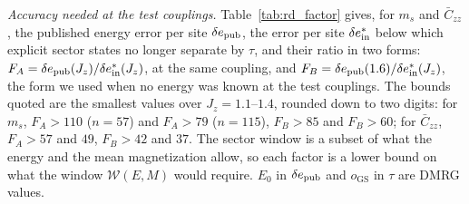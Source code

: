 \documentclass[aps,prx,onecolumn,10pt,nofootinbib,longbibliography,floatfix]{revtex4-2}
\theoremstyle{remark}
\newcommand{\Jz}{J_z}
\newcommand{\ms}{m_s}
\newcommand{\Czz}{\bar C_{zz}}
\newcommand{\de}{\delta e}
\newcommand{\des}{\delta e^{*}}
\newcommand{\W}{\mathcal{W}}
\newcommand{\GS}{\mathrm{GS}}
\begin{document}
\emph{Accuracy needed at the test couplings.} Table~\ref{tab:rd_factor} gives, for $\ms$ and $\Czz$, the published
energy error per site $\de_{\rm pub}$, the error per site $\des_{\rm in}$ below which explicit sector states no longer
separate by $\tau$, and their ratio in two forms: $F_A=\de_{\rm pub}(\Jz)/\des_{\rm in}(\Jz)$, at the same coupling, and
$F_B=\de_{\rm pub}(1.6)/\des_{\rm in}(\Jz)$, the form we used when no energy was known at the test couplings. The %
bounds quoted are the smallest values over $\Jz=1.1$--$1.4$, rounded down to two digits: for $\ms$, $F_A>110$ %
($n=57$) and $F_A>79$ ($n=115$), $F_B>85$ and $F_B>60$; for $\Czz$, $F_A>57$ and $49$, $F_B>42$ and $37$. The sector %
window is a subset of what the energy and the mean magnetization allow, so each factor is a lower bound on what
the window $\W(E,M)$ would require. $E_0$ in $\de_{\rm pub}$ and $o_\GS$ in $\tau$ are DMRG values.

\def\SMcap{Accuracy that the energy would need at the test couplings. $\de_{\rm pub}$: published energy error per %
site; $\des_{\rm in}$: error per site at which explicit sector states are $\tau$ apart; $F_A$ and $F_B$: the two ratios
defined in the text, rounded down. $^\ddagger$: $\Jz=1.5$ is in neither set and uses the states stored at $\Jz=1.4$
and $\Jz=1.6$.}\def\SMlab{tab:rd_factor}

\end{document}
